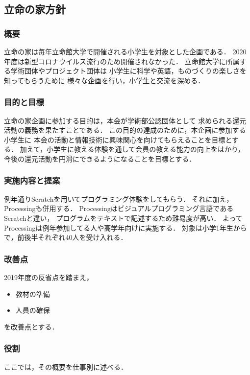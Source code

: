 \subsection*{立命の家方針}

\subsubsection*{概要}
立命の家は毎年立命館大学で開催される小学生を対象とした企画である．
2020年度は新型コロナウイルス流行のため開催されなかった．
立命館大学に所属する学術団体やプロジェクト団体は
小学生に科学や英語，ものづくりの楽しさを知ってもらうために
様々な企画を行い，小学生と交流を深める．

\subsubsection*{目的と目標}
立命の家企画に参加する目的は，本会が学術部公認団体として
求められる還元活動の義務を果たすことである．
この目的の達成のために，本企画に参加する小学生に
本会の活動と情報技術に興味関心を向けてもらえることを目標とする．
加えて，小学生に教える体験を通して会員の教える能力の向上をはかり，
今後の還元活動を円滑にできるようになることを目標とする．

\subsubsection*{実施内容と提案}
例年通りScratchを用いてプログラミング体験をしてもらう．
それに加え，Processingも併用する．
Processingはビジュアルプログラミング言語であるScratchと違い，
プログラムをテキストで記述するため難易度が高い．
よってProcessingは例年参加してる人や高学年向けに実施する．
対象は小学1年生からで，前後半それぞれ40人を受け入れる．

\subsubsection*{改善点}
2019年度の反省点を踏まえ，
\begin{itemize}
  \item 教材の準備
  \item 人員の確保
\end{itemize}
を改善点とする．

\subsubsection*{役割}
ここでは，その概要を仕事別に述べる．

